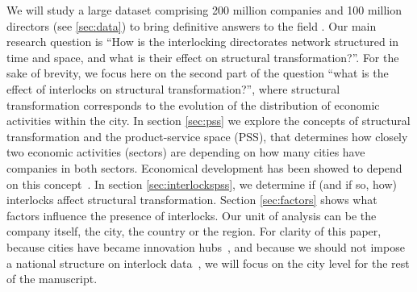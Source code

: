 We will study a large dataset comprising 200 million companies and 100 million directors (see \ref{sec:data}) to bring definitive answers to the field .
Our main research question is ``How is the interlocking directorates network structured in time and space, and what is their effect on structural transformation?''.
For the sake of brevity, we focus here on the second part of the question ``what is the effect of interlocks on structural transformation?'',
where structural transformation corresponds to the evolution of the distribution of economic activities within the city.
In section \ref{sec:pss} we explore the concepts of structural transformation and the product-service space (PSS), 
that determines how closely two economic activities (sectors) are depending on how many cities have companies in both sectors.
Economical development has been showed to depend on this concept~\citep{hidalgo2009}.
In section \ref{sec:interlockspss}, we determine if (and if so, how) interlocks affect structural transformation.
Section \ref{sec:factors} shows what factors influence the presence of interlocks.
Our unit of analysis can be the company itself, the city, the country or the region. 
For clarity of this paper, 
because cities have became innovation hubs~\citep{Belderbos2014}, 
and because we should not impose a national structure on interlock data~\citep{Heemskerk2016},
we will focus on the city level for the rest of the manuscript.


